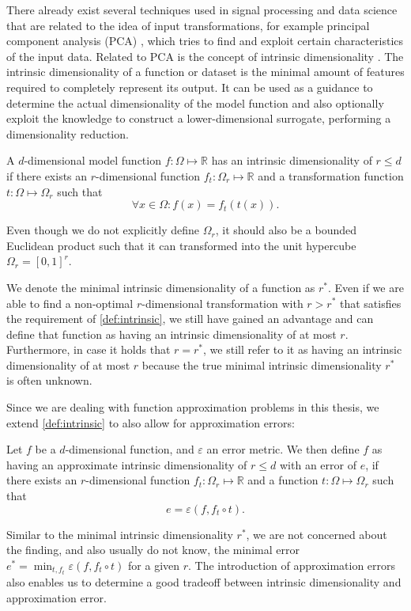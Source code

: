 \documentclass[
  a4paper,  %
  twoside,  %
  bibliography=totoc,
  headsepline,
  cleardoublepage=empty,
  parskip=half,
  draft=false
]{scrbook}
\begin{document}
There already exist several techniques used in signal processing and data science that are related to the idea of input transformations, for example principal component analysis (PCA) \cite{Abdi2010}, which tries to find and exploit certain characteristics of the input data.
Related to PCA is the concept of intrinsic dimensionality \cite{Bennett1969}.
The intrinsic dimensionality of a function or dataset is the minimal amount of features required to completely represent its output.
It can be used as a guidance to determine the actual dimensionality of the model function and also optionally exploit the knowledge to construct a lower-dimensional surrogate, \ie performing a dimensionality reduction.

\begin{definition}
A $d$-dimensional model function $f \colon \Omega \mapsto \mathds{R}$ has an intrinsic dimensionality of $r \leq d$ if there exists an $r$-dimensional function $f_t \colon \Omega_r \mapsto \mathds{R}$ and a transformation function $t \colon \Omega \mapsto \Omega_r$ such that
\begin{equation}
\forall x \in \Omega \colon f(x)=f_t(t(x)).
\end{equation}
\label{def:intrinsic}
\end{definition}
Even though we do not explicitly define $\Omega_r$, it should also be a bounded Euclidean product such that it can  transformed into the unit hypercube $\Omega_r=[0,1]^r$.

We denote the minimal intrinsic dimensionality of a function as $r^\ast$.
Even if we are able to find a non-optimal $r$-dimensional transformation with $r > r^\ast$ that satisfies the requirement of \cref{def:intrinsic}, we still have gained an advantage and can define that function as having an intrinsic dimensionality of at most $r$.
Furthermore, in case it holds that $r=r^\ast$, we still refer to it as having an intrinsic dimensionality of at most $r$ because the true minimal intrinsic dimensionality $r^\ast$ is often unknown.

Since we are dealing with function approximation problems in this thesis, we extend \cref{def:intrinsic} to also allow for approximation errors:
\begin{definition}
Let $f$ be a $d$-dimensional function, and $\varepsilon$ an error metric.
We then define $f$ as having an approximate intrinsic dimensionality of $r \leq d$ with an error of $e$, if there exists an $r$-dimensional function $f_t \colon \Omega_r \mapsto \mathds{R}$ and a function $t \colon \Omega \mapsto \Omega_r$ such that
\begin{equation}
e=\varepsilon\left(f,  f_t \circ t\right).
\end{equation}
\end{definition}
%
Similar to the minimal intrinsic dimensionality $r^\ast$, we are not concerned about the finding, and also usually do not know, the minimal error $e^\ast=\min_{t, f_t} \varepsilon\left(f,  f_t \circ t\right)$ for a given $r$.
The introduction of approximation errors also enables us to determine a good tradeoff between intrinsic dimensionality and approximation error.
\end{document}
